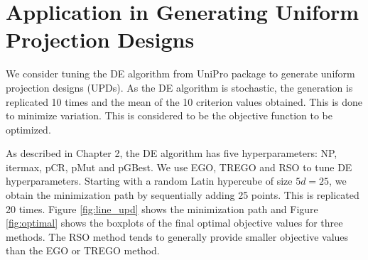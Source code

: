 \documentclass [PhD] {package/uclathes}
\begin{document}
\section{Application in {Generating Uniform Projection Designs}}
We consider tuning the DE algorithm from UniPro package to generate uniform projection designs (UPDs). As the DE algorithm is stochastic, the generation is replicated 10 times and the mean of the 10 criterion values obtained. This is done to minimize variation. This is considered to be the objective function to be optimized.


As described in Chapter 2, the DE algorithm has five hyperparameters: NP, itermax, pCR, pMut and pGBest. We use EGO, TREGO and RSO to tune DE hyperparameters. %
Starting with a random Latin hypercube of size $5d=25$, we obtain the minimization path by sequentially adding 25 points. This is replicated 20 times. Figure \ref{fig:line_upd} shows the minimization path and Figure \ref{fig:optimal} shows the boxplots of the final optimal objective values for three methods. The RSO method tends to generally provide smaller objective values than the EGO or TREGO method.  %
\end{document}
